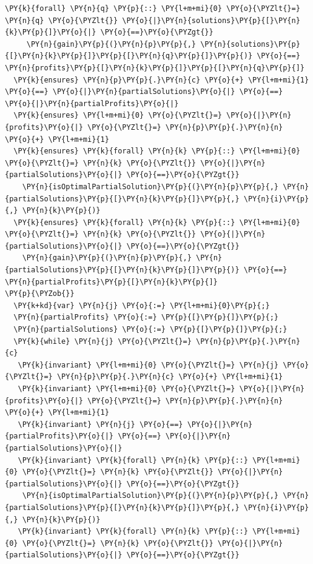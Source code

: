 \begin{sloppypar}
\begin{Verbatim}[commandchars=\\\{\}]
    \PY{k}{forall} \PY{n}{q} \PY{p}{::} \PY{l+m+mi}{0} \PY{o}{\PYZlt{}=} \PY{n}{q} \PY{o}{\PYZlt{}} \PY{o}{|}\PY{n}{solutions}\PY{p}{[}\PY{n}{k}\PY{p}{]}\PY{o}{|} \PY{o}{==}\PY{o}{\PYZgt{}} 
     \PY{n}{gain}\PY{p}{(}\PY{n}{p}\PY{p}{,} \PY{n}{solutions}\PY{p}{[}\PY{n}{k}\PY{p}{]}\PY{p}{[}\PY{n}{q}\PY{p}{]}\PY{p}{)} \PY{o}{==} \PY{n}{profits}\PY{p}{[}\PY{n}{k}\PY{p}{]}\PY{p}{[}\PY{n}{q}\PY{p}{]}
  \PY{k}{ensures} \PY{n}{p}\PY{p}{.}\PY{n}{c} \PY{o}{+} \PY{l+m+mi}{1} \PY{o}{==} \PY{o}{|}\PY{n}{partialSolutions}\PY{o}{|} \PY{o}{==} \PY{o}{|}\PY{n}{partialProfits}\PY{o}{|}
  \PY{k}{ensures} \PY{l+m+mi}{0} \PY{o}{\PYZlt{}=} \PY{o}{|}\PY{n}{profits}\PY{o}{|} \PY{o}{\PYZlt{}=} \PY{n}{p}\PY{p}{.}\PY{n}{n} \PY{o}{+} \PY{l+m+mi}{1} 
  \PY{k}{ensures} \PY{k}{forall} \PY{n}{k} \PY{p}{::} \PY{l+m+mi}{0} \PY{o}{\PYZlt{}=} \PY{n}{k} \PY{o}{\PYZlt{}} \PY{o}{|}\PY{n}{partialSolutions}\PY{o}{|} \PY{o}{==}\PY{o}{\PYZgt{}} 
    \PY{n}{isOptimalPartialSolution}\PY{p}{(}\PY{n}{p}\PY{p}{,} \PY{n}{partialSolutions}\PY{p}{[}\PY{n}{k}\PY{p}{]}\PY{p}{,} \PY{n}{i}\PY{p}{,} \PY{n}{k}\PY{p}{)}
  \PY{k}{ensures} \PY{k}{forall} \PY{n}{k} \PY{p}{::} \PY{l+m+mi}{0} \PY{o}{\PYZlt{}=} \PY{n}{k} \PY{o}{\PYZlt{}} \PY{o}{|}\PY{n}{partialSolutions}\PY{o}{|} \PY{o}{==}\PY{o}{\PYZgt{}} 
    \PY{n}{gain}\PY{p}{(}\PY{n}{p}\PY{p}{,} \PY{n}{partialSolutions}\PY{p}{[}\PY{n}{k}\PY{p}{]}\PY{p}{)} \PY{o}{==} \PY{n}{partialProfits}\PY{p}{[}\PY{n}{k}\PY{p}{]}
\PY{p}{\PYZob{}}
  \PY{k+kd}{var} \PY{n}{j} \PY{o}{:=} \PY{l+m+mi}{0}\PY{p}{;}
  \PY{n}{partialProfits} \PY{o}{:=} \PY{p}{[}\PY{p}{]}\PY{p}{;}
  \PY{n}{partialSolutions} \PY{o}{:=} \PY{p}{[}\PY{p}{]}\PY{p}{;}
  \PY{k}{while} \PY{n}{j} \PY{o}{\PYZlt{}=} \PY{n}{p}\PY{p}{.}\PY{n}{c}
   \PY{k}{invariant} \PY{l+m+mi}{0} \PY{o}{\PYZlt{}=} \PY{n}{j} \PY{o}{\PYZlt{}=} \PY{n}{p}\PY{p}{.}\PY{n}{c} \PY{o}{+} \PY{l+m+mi}{1}
   \PY{k}{invariant} \PY{l+m+mi}{0} \PY{o}{\PYZlt{}=} \PY{o}{|}\PY{n}{profits}\PY{o}{|} \PY{o}{\PYZlt{}=} \PY{n}{p}\PY{p}{.}\PY{n}{n} \PY{o}{+} \PY{l+m+mi}{1}
   \PY{k}{invariant} \PY{n}{j} \PY{o}{==} \PY{o}{|}\PY{n}{partialProfits}\PY{o}{|} \PY{o}{==} \PY{o}{|}\PY{n}{partialSolutions}\PY{o}{|}
   \PY{k}{invariant} \PY{k}{forall} \PY{n}{k} \PY{p}{::} \PY{l+m+mi}{0} \PY{o}{\PYZlt{}=} \PY{n}{k} \PY{o}{\PYZlt{}} \PY{o}{|}\PY{n}{partialSolutions}\PY{o}{|} \PY{o}{==}\PY{o}{\PYZgt{}} 
    \PY{n}{isOptimalPartialSolution}\PY{p}{(}\PY{n}{p}\PY{p}{,} \PY{n}{partialSolutions}\PY{p}{[}\PY{n}{k}\PY{p}{]}\PY{p}{,} \PY{n}{i}\PY{p}{,} \PY{n}{k}\PY{p}{)}
   \PY{k}{invariant} \PY{k}{forall} \PY{n}{k} \PY{p}{::} \PY{l+m+mi}{0} \PY{o}{\PYZlt{}=} \PY{n}{k} \PY{o}{\PYZlt{}} \PY{o}{|}\PY{n}{partialSolutions}\PY{o}{|} \PY{o}{==}\PY{o}{\PYZgt{}} 

\end{Verbatim}
\end{sloppypar}
